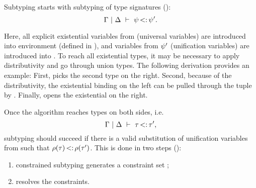 Subtyping starts with subtyping of type signatures
():
\[ \Gamma~\vert~\Delta\ \vdash\ \psi \operatorname{<:} \psi'. \]

Here, all explicit existential variables from \tysig (universal variables)
are introduced into environment \AEnv (defined in ), 
and variables from $\psi'$ (unification variables) are introduced into \UEnv.
To reach all existential types, it may be necessary to apply distributivity
and go through union types. The following derivation provides an example:
First,  picks the second type on the right.
Second, because of the distributivity, the existential binding on the left
can be pulled through the tuple by .
Finally,  opens the existential on the right.

Once the algorithm reaches types on both sides,
i.e. \[ \Gamma~\vert~\Delta\ \vdash\ \tau \operatorname{<:} \tau', \]
subtyping should succeed if there is 
a valid substitution \substvars of unification variables from \UEnv
such that $\rho(\tau) \operatorname{<:} \rho(\tau')$.
This is done in two steps ():
\begin{enumerate}
    \item constrained subtyping 
      generates a constraint set \CSet;
    \item \solvectrdflt resolves the constraints.
\end{enumerate}

